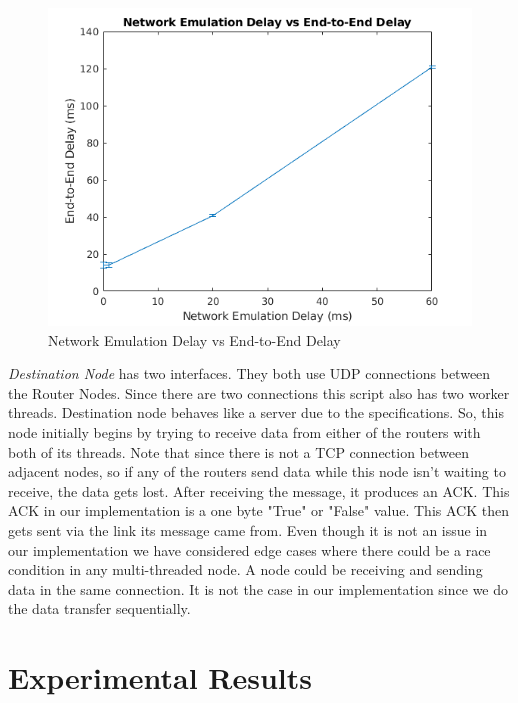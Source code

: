 \documentclass[conference]{IEEEtran}
\begin{document}
\begin{center}
    \begin{figure}[!hbtp]
        \centering
        \includegraphics{plot.png}
        \caption{Network Emulation Delay vs End-to-End Delay}
        \label{delay}
    \end{figure}
\end{center}


\par \textit{Destination Node} has two interfaces. They both use UDP connections between the Router Nodes. Since there are two connections this script also has two worker threads. Destination node behaves like a server due to the specifications. So, this node initially begins by trying to receive data from either of the routers with both of its threads. Note that since there is not a TCP connection between adjacent nodes, so if any of the routers send data while this node isn't waiting to receive, the data gets lost. After receiving the message, it produces an ACK. This ACK in our implementation is a one byte "True" or "False" value. This ACK then gets sent via the link its message came from. Even though it is not an issue in our implementation we have considered edge cases where there could be a race condition in any multi-threaded node. A node could be receiving and sending data in the same connection. It is not the case in our implementation since we do the data transfer sequentially. 

\section{Experimental Results} \label{experimential}
\end{document}
